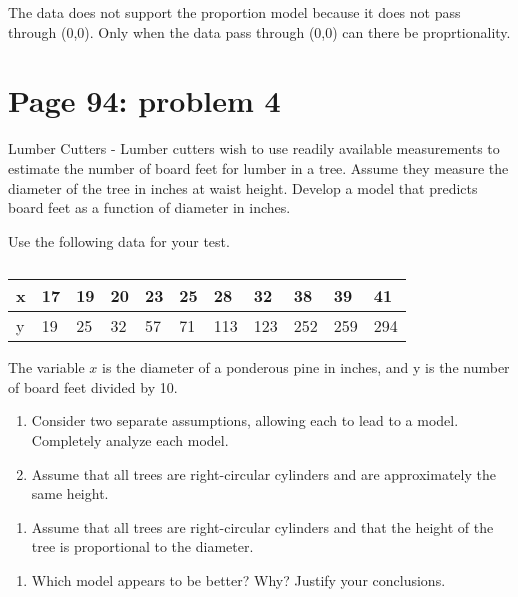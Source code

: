 \documentclass[]{article}
\providecommand{\tightlist}{%
  \setlength{\itemsep}{0pt}\setlength{\parskip}{0pt}}
\begin{document}
The data does not support the proportion model because it does not pass
through (0,0). Only when the data pass through (0,0) can there be
proprtionality.

\section{Page 94: problem 4}\label{page-94-problem-4}

Lumber Cutters - Lumber cutters wish to use readily available
measurements to estimate the number of board feet for lumber in a tree.
Assume they measure the diameter of the tree in inches at waist height.
Develop a model that predicts board feet as a function of diameter in
inches.

Use the following data for your test.

\begin{table}[!htbp]
\centering
\caption{}
\label{my-label}
\begin{tabular}{l|llllllllll}
x & 17 & 19 & 20 & 23 & 25 & 28 & 32 & 38 & 39 & 41 \\ \hline
y & 19 & 25 & 32 & 57 & 71 & 113 & 123 & 252 & 259 & 294
\end{tabular}
\end{table}

The variable \(x\) is the diameter of a ponderous pine in inches, and y
is the number of board feet divided by 10.

\begin{enumerate}
\def\labelenumi{\alph{enumi}.}
\tightlist
\item
  Consider two separate assumptions, allowing each to lead to a model.
  Completely analyze each model.
\item
  Assume that all trees are right-circular cylinders and are
  approximately the same height.
\end{enumerate}

\begin{enumerate}
\def\labelenumi{\roman{enumi}.}
\setcounter{enumi}{1}
\tightlist
\item
  Assume that all trees are right-circular cylinders and that the height
  of the tree is proportional to the diameter.
\end{enumerate}

\begin{enumerate}
\def\labelenumi{\alph{enumi}.}
\setcounter{enumi}{1}
\tightlist
\item
  Which model appears to be better? Why? Justify your conclusions.
\end{enumerate}
\end{document}
